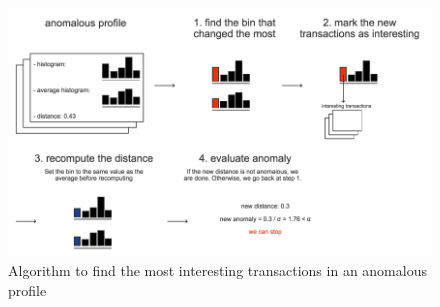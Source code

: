 \begin{figure}[h]
\centering
\includegraphics[width=450]{images/transactions_analysis.pdf}
\caption{Algorithm to find the most interesting transactions in an anomalous profile}
\label{fig:transactions_analysis}
\end{figure}

